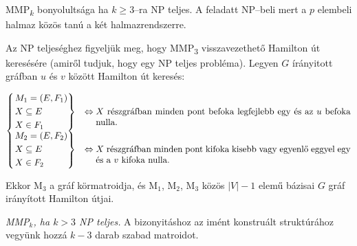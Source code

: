 MMP\textsubscript{$k$} bonyolultsága ha $k \geq 3$--ra NP teljes. A feladatt
NP--beli mert a $p$ elembeli halmaz közös tanú a két halmazrendszerre.

Az NP teljeséghez figyeljük meg, hogy MMP\textsubscript{$3$} visszavezethető
Hamilton út keresésére (amiről tudjuk, hogy egy NP teljes probléma). Legyen $G$
írányitott gráfban $u$ és $v$ között Hamilton út keresés:

\[
\begin{cases}
\begin{rcases}
M_1=(E,F_1) \\
X \subseteq E \\
X \in F_1
\end{rcases} &\Leftrightarrow \parbox[t]{10cm} {$X$ részgráfban minden pont
befoka legfejlebb egy és az $u$ befoka nulla.} \\
\begin{rcases}
M_2=(E,F_2) \\
X \subseteq E \\
X \in F_2
\end{rcases} &\Leftrightarrow \parbox[t]{10cm} {$X$ részgráfban minden pont
kifoka kisebb vagy egyenlő eggyel egy és a $v$ kifoka nulla.} 
\end{cases}
\]

Ekkor M$_3$  a gráf körmatroidja, és M$_1$, M$_2$, M$_3$ közös $|V|-1$ elemű
bázisai $G$ gráf irányított Hamilton útjai.

\vspace{0.4cm}
\emph{MMP$_k$, ha $k>3$ NP teljes.} 
A bizonyitáshoz az imént konstruált struktúrához vegyünk hozzá $k-3$ darab
szabad matroidot.
